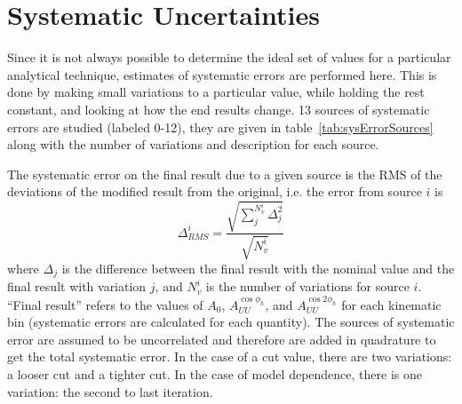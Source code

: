 \chapter{Systematic Uncertainties}
\label{cha:SystematicUncertainties}

Since it is not always possible to determine the ideal set of values for a particular analytical technique, estimates of systematic errors are performed here.
This is done by making small variations to a particular value, while holding the rest constant, and looking at how the end results change.
13 sources of systematic errors are studied (labeled 0-12), they are given in table~\ref{tab:sysErrorSources} along with the number of variations and description for each source.

The systematic error on the final result due to a given source is the RMS of the deviations of the modified result from the original, i.e. the error from source $i$ is
%
\begin{equation}
\label{eq:RMS}
\Delta_{RMS}^i = \frac{\sqrt{\sum_j^{N_v^i} \Delta_j^2}}{\sqrt{N_v^i}}
\end{equation}
%
where $\Delta_j$ is the difference between the final result with the nominal value and the final result with variation $j$, and $N_v^i$ is the number of variations for source $i$.
``Final result'' refers to the values of $A_0$, $A_{UU}^{\cos\phi_h}$, and $A_{UU}^{\cos 2\phi_h}$ for each kinematic bin (systematic errors are calculated for each quantity).
The sources of systematic error are assumed to be uncorrelated and therefore are added in quadrature to get the total systematic error.
In the case of a cut value, there are two variations: a looser cut and a tighter cut.
In the case of model dependence, there is one variation: the second to last iteration.
%
